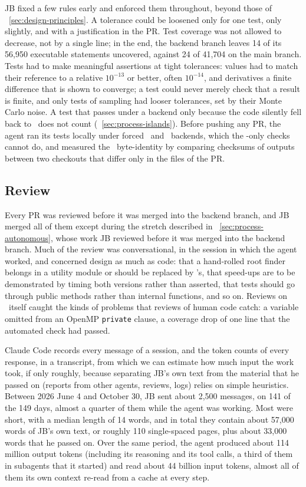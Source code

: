 JB fixed a few rules early and enforced them throughout, beyond those of
\sectionname~\ref{sec:design-principles}. A tolerance could be loosened
only for one test, only slightly, and with a justification in the PR.
Test coverage was not allowed to decrease, not by a single line; in the
end, the backend branch leaves 14 of its 56,950 executable statements
uncovered, against 24 of 41,704 on the main branch. Tests had to make
meaningful assertions at tight tolerances: values had to match their
reference to a relative $10^{-13}$ or better, often $10^{-14}$, and
derivatives a finite difference that is shown to converge; a test could
never merely check that a result is finite, and only tests of sampling
had looser tolerances, set by their Monte Carlo noise. A test that
passes under a backend only because the code silently fell back to
\numpy\ does not count (\sectionname~\ref{sec:process-islands}). Before
pushing any PR, the agent ran its tests locally under forced \jax\ and
\torch\ backends, which the \numpy-only checks cannot do, and measured
the \numpy\ byte-identity by comparing checksums of outputs between two
checkouts that differ only in the files of the PR.

\subsection{Review}\label{sec:process-review}

Every PR was reviewed before it was merged into the backend branch, and
JB merged all of them except during the stretch described in
\sectionname~\ref{sec:process-autonomous}, whose work JB reviewed before
it was merged into the backend branch. Much of the review was
conversational, in the session in which the agent worked, and
concerned design as much as code: that a hand-rolled root finder
belongs in a utility module or should be replaced by \scipy's, that
speed-ups are to be demonstrated by timing both versions rather than
asserted, that tests should go through public methods rather than
internal functions, and so on. Reviews on \github\ itself caught the
kinds of problems that reviews of human code catch: a variable omitted
from an OpenMP \texttt{private} clause, a coverage drop of one line that
the automated check had passed.

Claude Code records every message of a session, and the token counts of
every response, in a transcript, from which we can estimate how much
input the work took, if only roughly, because separating JB's own text
from the material that he passed on (reports from other agents,
reviews, logs) relies on simple heuristics. Between 2026 June 4 and
October 30, JB sent about 2,500 messages, on 141 of the 149 days,
almost a quarter of them while the agent was working. Most were short,
with a median length of 14 words, and in total they contain about
57,000 words of JB's own text, or roughly 110 single-spaced pages, plus
about 33,000 words that he passed on. Over the same period, the agent
produced about 114 million output tokens (including its reasoning and
its tool calls, a third of them in subagents that it started) and read
about 44 billion input tokens, almost all of them its own context
re-read from a cache at every step.

